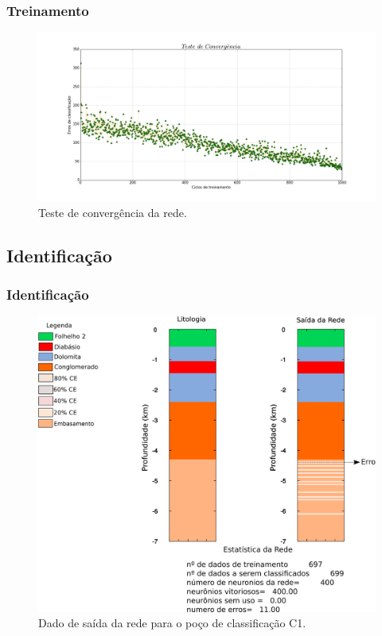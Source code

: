 \documentclass[10pt]{beamer} %
\begin{document}
\begin{frame}
	\frametitle{Treinamento}
	\begin{figure}[H]
		\centering
			\includegraphics[scale=0.23]{Imagens/conv070917.png}
		\caption{Teste de convergência da rede.}
		\label{convergencia}
	\end{figure} 
\end{frame}

\subsection{Identificação}

\begin{frame}
	\frametitle{Identificação}
\begin{figure}[H]
	\centering
		\includegraphics[scale=0.45]{Imagens/IDC1.png}
	\caption{Dado de saída da rede para o poço de classificação C1.}
	\label{Class C1}
\end{figure} 
\end{frame}
\end{document}
